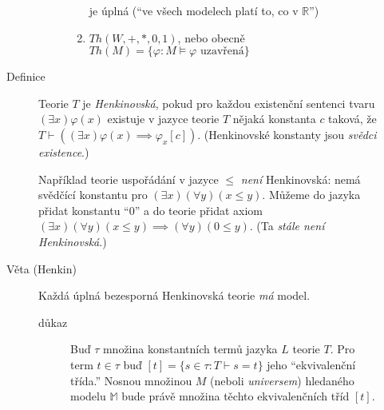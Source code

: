 \documentclass[a4paper]{article}
\begin{document}
\begin{description}
\begin{description}
\begin{description}
\begin{enumerate}
									je úplná (\enquote{ve všech modelech platí to, co v $\mathbb{R}$})
								\item $Th(W, +, *, 0, 1)$, nebo obecně
									$Th(M) = \{\varphi : M \models \varphi \text{ uzavřená}\}$
							\end{enumerate}
					\end{description}
				\item[Definice] Teorie $T$ je \textit{Henkinovská}, pokud pro každou existenční
					sentenci tvaru $(\exists x) \varphi(x)$ existuje v jazyce teorie $T$
					nějaká konstanta $c$ taková, že
					$T \vdash ((\exists x) \varphi(x) \implies \varphi_x[c])$.
					(Henkinovské konstanty jsou \textit{svědci existence}.)

					Například teorie uspořádání v jazyce $\le$ \textit{není} Henkinovská:
					nemá svědčící konstantu pro $(\exists x)(\forall y)(x \le y)$.
					Můžeme do jazyka přidat konstantu \enquote{$0$} a do teorie
					přidat axiom $(\exists x)(\forall y)(x \le y) \implies (\forall y)(0 \le y)$.
					(Ta \textit{stále není Henkinovská}.)
				\item[Věta (Henkin)] Každá úplná bezesporná Henkinovská teorie \textit{má} model.
					\begin{description}
						\item[důkaz] Buď $\tau$ množina konstantních termů jazyka $L$ teorie $T$.
							Pro term $t \in \tau$ buď $[t] = \{s \in \tau : T \vdash s = t\}$ jeho
							\enquote{ekvivalenční třída.} Nosnou množinou $M$ (neboli \textit{universem})
							hledaného modelu $\mathbb{M}$ bude právě množina těchto ekvivalenčních tříd
							$[t]$.


\end{description}
\end{description}
\end{description}
\end{document}
